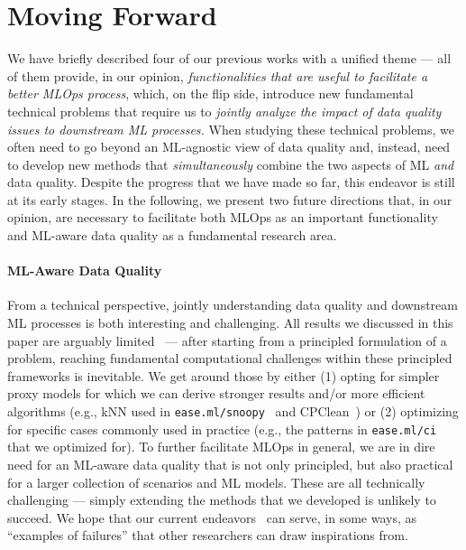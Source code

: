 \documentclass[11pt]{article}
\begin{document}
\section{Moving Forward}
\label{sec:limitations}

We have briefly described four 
of our previous works with a unified theme ---
all of them provide, in our opinion, \textit{
functionalities that are useful to 
facilitate a better MLOps process}, which, on 
the flip side, introduce new fundamental 
technical problems that require us to 
\textit{jointly analyze the impact
of data quality issues to downstream ML processes.}
When studying these technical problems,
we often need to 
go beyond an ML-agnostic view 
of data quality and, instead, need to develop 
new methods that \emph{simultaneously} combine the two aspects of ML \emph{and} data quality.
Despite the progress that we have made so far, this endeavor is still at its early stages. 
In the following, we present two future directions that, in our opinion,
are necessary to facilitate both MLOps as an important
functionality and ML-aware data quality as a fundamental research area.


\paragraph*{ML-Aware Data Quality}
From a technical perspective,
jointly understanding data quality and 
downstream ML processes is both interesting
and challenging. All results we discussed
in this paper are arguably limited~\cite{karlavs2020nearest, renggli2020automatic, karimi2020online, renggli2019continuous} --- after starting 
from a principled formulation of a 
problem, reaching fundamental 
computational challenges within these  
principled frameworks is inevitable. We get around
those by either (1) opting for simpler 
proxy models for which we can derive 
stronger results and/or more efficient algorithms
(e.g., kNN used in \texttt{ease.ml/snoopy}~\cite{renggli2020automatic}
and CPClean~\cite{karlavs2020nearest})
or (2) optimizing for specific cases 
commonly used in practice (e.g., the patterns in \texttt{ease.ml/ci}~\cite{renggli2019continuous} that we optimized for).
To further facilitate MLOps in general,
we are in dire need for an 
ML-aware data quality that is not only principled,
but also practical for a larger 
collection of scenarios and ML models.
These are all technically challenging --- simply
extending the methods that we developed is unlikely to succeed.
We hope that our current endeavors~\cite{karlavs2020nearest, renggli2020automatic, karimi2020online, renggli2019continuous} can serve, in
some ways, as ``examples of failures''
that other researchers can draw inspirations from.
\end{document}
